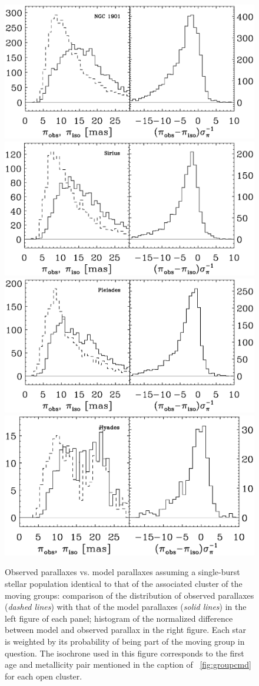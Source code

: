 \clearpage
\begin{figure}
\includegraphics[width=.475\textwidth]{figs_groups/clusterhist_ngc1901.eps}
\includegraphics[width=.475\textwidth]{figs_groups/clusterhist_sirius.eps}\\
\includegraphics[width=.475\textwidth]{figs_groups/clusterhist_pleiades.eps}
\includegraphics[width=.475\textwidth]{figs_groups/clusterhist_hyades.eps}
\caption[Observed parallaxes vs. model parallaxes assuming a
  single-burst stellar population identical to that of the associated
  cluster of the moving groups]{Observed parallaxes vs. model
  parallaxes assuming a single-burst stellar population identical to
  that of the associated cluster of the moving groups: comparison of
  the distribution of observed parallaxes (\emph{dashed lines}) with
  that of the model parallaxes (\emph{solid lines}) in the left figure
  of each panel; histogram of the normalized difference between model
  and observed parallax in the right figure.  Each star is weighted by
  its probability of being part of the moving group in question. The
  isochrone used in this figure corresponds to the first age and
  metallicity pair mentioned in the caption of
  \figurename~\ref{fig:groupcmd} for each open
  cluster.}\label{fig:iscluster}
\end{figure}

